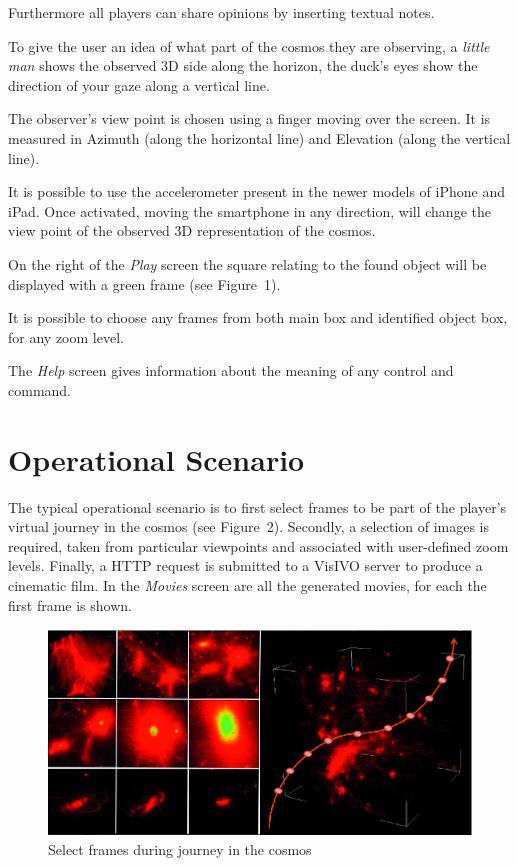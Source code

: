 Furthermore all players can share opinions by inserting textual notes.

To give the user an idea of what part of the cosmos they are observing, a \emph{little man} shows the observed  3D side along the horizon,  the duck's eyes show the direction of your gaze along a vertical line.

The observer's view point  is chosen using a finger moving over the screen. It is measured in Azimuth (along the horizontal line) and Elevation (along the vertical line).

It is possible to use the accelerometer present in the newer models of iPhone and iPad. Once activated, moving the smartphone in any direction, will change the view point of the observed 3D representation of the cosmos.

On the right of the \emph{Play} screen the square relating to the found object will be displayed with a 
green frame (see Figure~1).

It is possible to choose any frames from both main box and identified object box, for  any zoom level.

The \emph{Help} screen gives information about the meaning of any control and command.

\section{Operational Scenario}
The typical operational scenario is to first select frames to be part of the player's virtual journey in the cosmos (see Figure~2). Secondly, a selection of images is required, taken from particular viewpoints and associated with user-defined zoom levels. Finally, a HTTP request is submitted to a VisIVO server to produce a cinematic film. In the \emph{Movies} screen are all the generated movies, for each the first frame is shown.
\begin{figure}[ht]
\centering
\includegraphics[scale=0.9]{part5/Massimino_O24/P024_f2}
\caption{Select frames during journey in the cosmos}
\end{figure}

